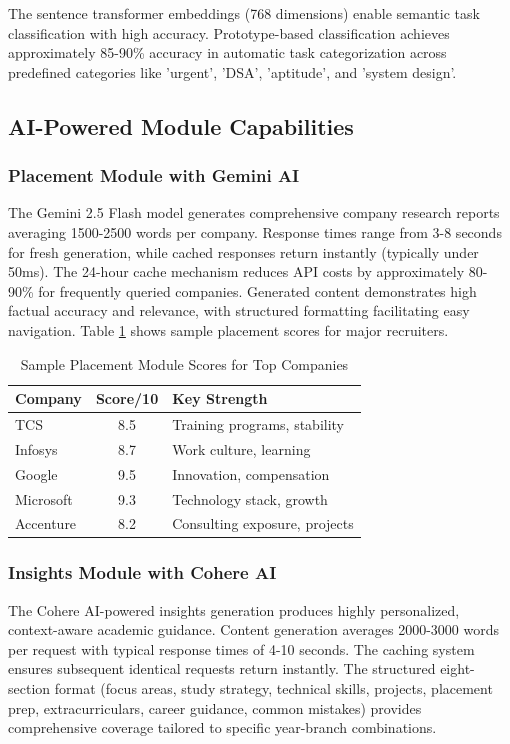 \documentclass[conference]{IEEEtran}
\begin{document}
The sentence transformer embeddings (768 dimensions) enable semantic task classification with high accuracy. Prototype-based classification achieves approximately 85-90\% accuracy in automatic task categorization across predefined categories like 'urgent', 'DSA', 'aptitude', and 'system design'.

\subsection{AI-Powered Module Capabilities}
\subsubsection{Placement Module with Gemini AI}
The Gemini 2.5 Flash model generates comprehensive company research reports averaging 1500-2500 words per company. Response times range from 3-8 seconds for fresh generation, while cached responses return instantly (typically under 50ms). The 24-hour cache mechanism reduces API costs by approximately 80-90\% for frequently queried companies. Generated content demonstrates high factual accuracy and relevance, with structured formatting facilitating easy navigation. Table \ref{tab:placement_sample} shows sample placement scores for major recruiters.

\begin{table}[htbp]
\caption{Sample Placement Module Scores for Top Companies}
\label{tab:placement_sample}
\begin{center}
\begin{tabular}{|l|c|l|}
\hline
\textbf{Company} & \textbf{Score/10} & \textbf{Key Strength} \\
\hline
TCS & 8.5 & Training programs, stability \\
\hline
Infosys & 8.7 & Work culture, learning \\
\hline
Google & 9.5 & Innovation, compensation \\
\hline
Microsoft & 9.3 & Technology stack, growth \\
\hline
Accenture & 8.2 & Consulting exposure, projects \\
\hline
\end{tabular}
\end{center}
\end{table}

\subsubsection{Insights Module with Cohere AI}
The Cohere AI-powered insights generation produces highly personalized, context-aware academic guidance. Content generation averages 2000-3000 words per request with typical response times of 4-10 seconds. The caching system ensures subsequent identical requests return instantly. The structured eight-section format (focus areas, study strategy, technical skills, projects, placement prep, extracurriculars, career guidance, common mistakes) provides comprehensive coverage tailored to specific year-branch combinations.
\end{document}
